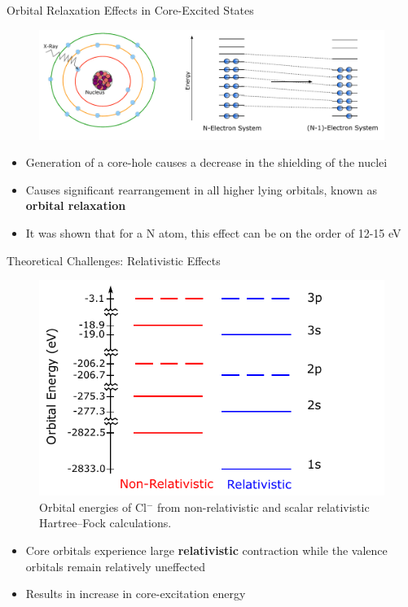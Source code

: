 \documentclass[t]{beamer}
\begin{document}
\begin{frame}{Orbital Relaxation Effects in Core-Excited States}
\begin{figure}[!t]
\includegraphics[width=\linewidth]{core_hole_generation_2.pdf}
\end{figure}
\begin{itemize}
\item Generation of a core-hole causes a decrease in the shielding of the nuclei 
\item Causes significant rearrangement in all higher lying orbitals, known as \textbf{orbital relaxation}
\item It was shown that for a N atom, this effect can be on the order of 12-15 eV
\end{itemize}
\end{frame}

\begin{frame}{Theoretical Challenges: Relativistic Effects}
\begin{figure}
\includegraphics[scale=0.8]{relativistic_contraction.pdf}
\caption*{Orbital energies of Cl$^{-}$ from non-relativistic and scalar relativistic Hartree--Fock calculations.}
\end{figure}
\begin{itemize}
\item Core orbitals experience large \textbf{relativistic} contraction while the valence orbitals remain relatively uneffected
\item Results in increase in core-excitation energy
\end{itemize}
\end{frame}
\end{document}
